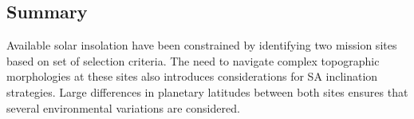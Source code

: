 \subsection{Summary}
Available solar insolation have been constrained by identifying two mission sites based on set of selection criteria. The need to navigate complex topographic morphologies at these sites also introduces considerations for \ac{SA} inclination strategies. Large differences in planetary latitudes between both sites ensures that several environmental variations are considered.
